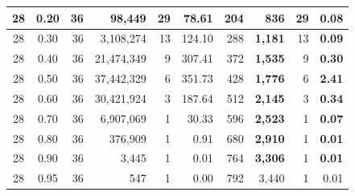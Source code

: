\begin{table}[H]
\begin{tabular}{|c|c|r|r|r|r|r|r|r|r|}
        28                              & 0.20                               & 36                                              & 98,449                                           & 29            & 78.61         & 204           & \textbf{ 836}    & 29            & \textbf{0.08} \\ \hline
        28                              & 0.30                               & 36                                              & 3,108,274                                        & 13            & 124.10        & 288           & \textbf{1,181}   & 13            & \textbf{0.09} \\ \hline
        28                              & 0.40                               & 36                                              & 21,474,349                                       & 9             & 307.41        & 372           & \textbf{1,535}   & 9             & \textbf{0.30} \\ \hline
        28                              & 0.50                               & 36                                              & 37,442,329                                       & 6             & 351.73        & 428           & \textbf{1,776}   & 6             & \textbf{2.41} \\ \hline
        28                              & 0.60                               & 36                                              & 30,421,924                                       & 3             & 187.64        & 512           & \textbf{2,145}   & 3             & \textbf{0.34} \\ \hline
        28                              & 0.70                               & 36                                              & 6,907,069                                        & 1             & 30.33         & 596           & \textbf{2,523}   & 1             & \textbf{0.07} \\ \hline
        28                              & 0.80                               & 36                                              & 376,909                                          & 1             & 0.91          & 680           & \textbf{2,910}   & 1             & \textbf{0.01} \\ \hline
        28                              & 0.90                               & 36                                              & 3,445                                            & 1             & 0.01          & 764           & \textbf{3,306}   & 1             & \textbf{0.01} \\ \hline
        28                              & 0.95                               & 36                                              & 547                                              & 1             & 0.00          & 792           & 3,440            & 1             & 0.01          \\ \hline
    \end{tabular}
\end{table}

